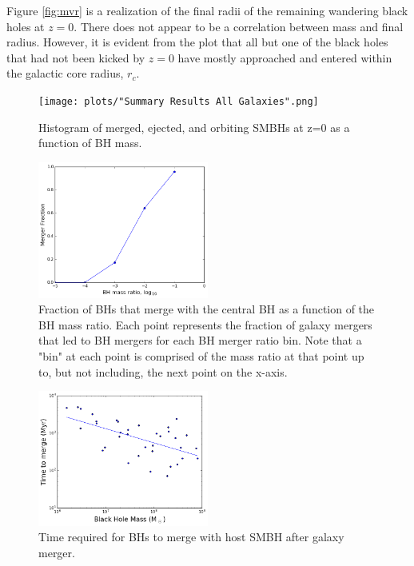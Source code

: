 \documentclass[english, backref,breaklinks,colorlinks,citecolor=blue, usenatbib]{mnras}
\begin{document}
Figure \ref{fig:mvr} is a realization of the final radii of the remaining wandering black holes at $z=0$.  There does not appear to be a correlation between mass and final radius.  However, it is evident from the plot that all but one of the black holes that had not been kicked by $z=0$ have mostly approached and entered within the galactic core radius, $r_c$.

\begin{figure}[ht]
\begin{center}
\texttt{[image: plots/"Summary Results All Galaxies".png]}
\caption{Histogram of merged, ejected, and orbiting SMBHs at z=0 as a function of BH mass.}
\label{fig:meosmbh}
\end{center}
\end{figure}

\begin{figure}[ht]
\begin{center}
\includegraphics[width=0.5\textwidth]{plots/q_merger_fraction.png}
\caption{Fraction of BHs that merge with the central BH as a function of the BH mass ratio.  Each point represents the fraction of galaxy mergers that led to BH mergers for each BH merger ratio bin.  Note that a "bin" at each point is comprised of the mass ratio at that point up to, but not including, the next point on the x-axis.}
\label{fig:q_merge_fraction}
\end{center}
\end{figure}

\begin{figure}[ht]
\begin{center}
\includegraphics[width=0.5\textwidth]{plots/time_to_merge.png}
\caption{Time required for BHs to merge with host SMBH after galaxy merger.}
\label{fig:time_to_merge}
\end{center}
\end{figure}
\end{document}
